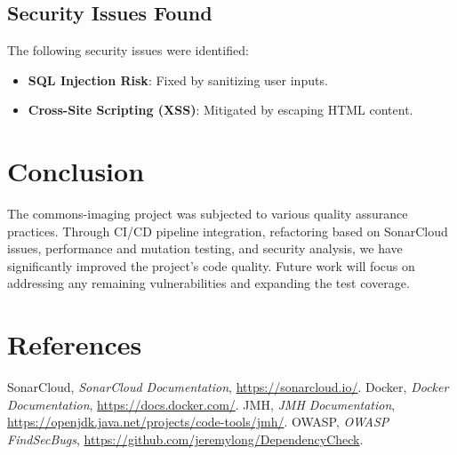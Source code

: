 \documentclass[a4paper,12pt]{report}
\begin{document}
\section{Security Issues Found}
The following security issues were identified:
\begin{itemize}
    \item \textbf{SQL Injection Risk}: Fixed by sanitizing user inputs.
    \item \textbf{Cross-Site Scripting (XSS)}: Mitigated by escaping HTML content.
\end{itemize}

\newpage

\chapter{Conclusion}
The commons-imaging project was subjected to various quality assurance practices. Through CI/CD pipeline integration, refactoring based on SonarCloud issues, performance and mutation testing, and security analysis, we have significantly improved the project’s code quality. Future work will focus on addressing any remaining vulnerabilities and expanding the test coverage.

\newpage

\chapter{References}
\begin{thebibliography}{99}
     SonarCloud, \textit{SonarCloud Documentation}, \url{https://sonarcloud.io/}.
     Docker, \textit{Docker Documentation}, \url{https://docs.docker.com/}.
     JMH, \textit{JMH Documentation}, \url{https://openjdk.java.net/projects/code-tools/jmh/}.
     OWASP, \textit{OWASP FindSecBugs}, \url{https://github.com/jeremylong/DependencyCheck}.
\end{thebibliography}
\end{document}

